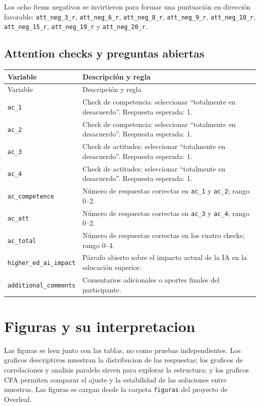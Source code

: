 \documentclass[11pt,a4paper]{article}
\begin{document}
Los ocho ítems negativos se invirtieron para formar una puntuación en dirección favorable: \texttt{att\_neg\_3\_r}, \texttt{att\_neg\_6\_r}, \texttt{att\_neg\_8\_r}, \texttt{att\_neg\_9\_r}, \texttt{att\_neg\_10\_r}, \texttt{att\_neg\_15\_r}, \texttt{att\_neg\_19\_r} y \texttt{att\_neg\_20\_r}.

\subsection{Attention checks y preguntas abiertas}

\begin{longtable}{p{}p{}}
\toprule
Variable & Descripción y regla \\
\midrule
\endfirsthead
\toprule
Variable & Descripción y regla \\
\midrule
\endhead
\texttt{ac\_1} & Check de competencia: seleccionar ``totalmente en desacuerdo''. Respuesta esperada: 1. \\
\texttt{ac\_2} & Check de competencia: seleccionar ``totalmente en desacuerdo''. Respuesta esperada: 1. \\
\texttt{ac\_3} & Check de actitudes: seleccionar ``totalmente en desacuerdo''. Respuesta esperada: 1. \\
\texttt{ac\_4} & Check de actitudes: seleccionar ``totalmente en desacuerdo''. Respuesta esperada: 1. \\
\texttt{ac\_competence} & Número de respuestas correctas en \texttt{ac\_1} y \texttt{ac\_2}; rango 0--2. \\
\texttt{ac\_att} & Número de respuestas correctas en \texttt{ac\_3} y \texttt{ac\_4}; rango 0--2. \\
\texttt{ac\_total} & Número de respuestas correctas en los cuatro checks; rango 0--4. \\
\texttt{higher\_ed\_ai\_impact} & Párrafo abierto sobre el impacto actual de la IA en la educación superior. \\
\texttt{additional\_comments} & Comentarios adicionales o aportes finales del participante. \\
\bottomrule
\end{longtable}

\clearpage
\section{Figuras y su interpretacion}

Las figuras se leen junto con las tablas, no como pruebas independientes. Los graficos descriptivos muestran la distribucion de las respuestas; los graficos de correlaciones y analisis paralelo sirven para explorar la estructura; y los graficos CFA permiten comparar el ajuste y la estabilidad de las soluciones entre muestras. Las figuras se cargan desde la carpeta \texttt{figuras} del proyecto de Overleaf.
\end{document}
